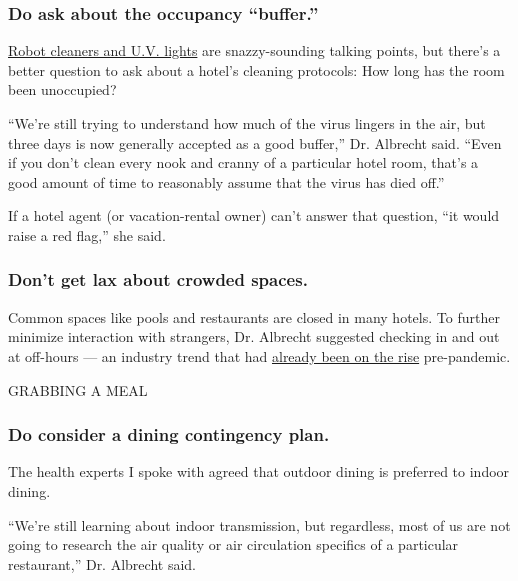 \hypertarget{do-ask-about-the-occupancy-buffer}{%
\subsubsection{\texorpdfstring{\textbf{Do ask about the occupancy
``buffer.''}}{Do ask about the occupancy ``buffer.''}}\label{do-ask-about-the-occupancy-buffer}}

\href{https://www.nytimes3xbfgragh.onion/2020/06/03/travel/the-most-important-word-in-the-hospitality-industry-clean.html}{Robot
cleaners and U.V. lights} are snazzy-sounding talking points, but
there's a better question to ask about a hotel's cleaning protocols: How
long has the room been unoccupied?

``We're still trying to understand how much of the virus lingers in the
air, but three days is now generally accepted as a good buffer,'' Dr.
Albrecht said. ``Even if you don't clean every nook and cranny of a
particular hotel room, that's a good amount of time to reasonably assume
that the virus has died off.''

If a hotel agent (or vacation-rental owner) can't answer that question,
``it would raise a red flag,'' she said.

\hypertarget{dont-get-lax-about-crowded-spaces}{%
\subsubsection{\texorpdfstring{\textbf{Don't get lax about crowded
spaces.}}{Don't get lax about crowded spaces.}}\label{dont-get-lax-about-crowded-spaces}}

Common spaces like pools and restaurants are closed in many hotels. To
further minimize interaction with strangers, Dr. Albrecht suggested
checking in and out at off-hours --- an industry trend that had
\href{https://www.nytimes3xbfgragh.onion/2020/02/18/travel/hotels-flexible-check-in.html}{already
been on the rise} pre-pandemic.

GRABBING A MEAL

\hypertarget{do-consider-a-dining-contingency-plan}{%
\subsubsection{Do consider a dining contingency
plan.}\label{do-consider-a-dining-contingency-plan}}

The health experts I spoke with agreed that outdoor dining is preferred
to indoor dining.

``We're still learning about indoor transmission, but regardless, most
of us are not going to research the air quality or air circulation
specifics of a particular restaurant,'' Dr. Albrecht said.

